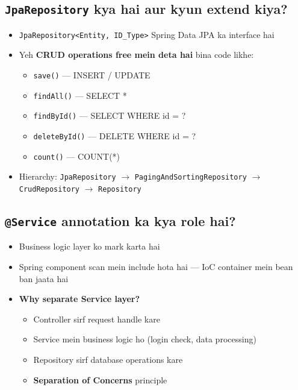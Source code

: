\documentclass[12pt,a4paper]{article}
\begin{document}
\subsection{\texttt{JpaRepository} kya hai aur kyun extend kiya?}

\begin{answerbox}
\begin{itemize}
    \item \texttt{JpaRepository<Entity, ID\_Type>} Spring Data JPA ka interface hai
    \item Yeh \textbf{CRUD operations free mein deta hai} bina code likhe:
    \begin{itemize}
        \item \texttt{save()} --- INSERT / UPDATE
        \item \texttt{findAll()} --- SELECT *
        \item \texttt{findById()} --- SELECT WHERE id = ?
        \item \texttt{deleteById()} --- DELETE WHERE id = ?
        \item \texttt{count()} --- COUNT(*)
    \end{itemize}
    \item Hierarchy: \texttt{JpaRepository} $\rightarrow$ \texttt{PagingAndSortingRepository} $\rightarrow$ \texttt{CrudRepository} $\rightarrow$ \texttt{Repository}
\end{itemize}
\end{answerbox}

\subsection{\texttt{@Service} annotation ka kya role hai?}

\begin{answerbox}
\begin{itemize}
    \item Business logic layer ko mark karta hai
    \item Spring component scan mein include hota hai --- IoC container mein bean ban jaata hai
    \item \textbf{Why separate Service layer?}
    \begin{itemize}
        \item Controller sirf request handle kare
        \item Service mein business logic ho (login check, data processing)
        \item Repository sirf database operations kare
        \item \textbf{Separation of Concerns} principle
    \end{itemize}
\end{itemize}
\end{answerbox}
\end{document}
